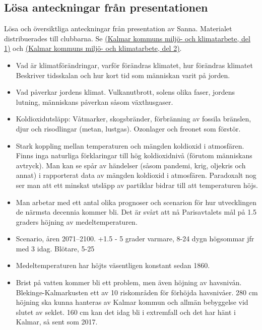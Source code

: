 \documentclass[12pt,a4paper]{article}
\begin{document}
\subsection{Lösa anteckningar från presentationen}
Lösa och översiktliga anteckningar från presentation av Sanna.
Materialet distribuerades till clubbarna.
Se \href{https://drive.google.com/file/d/1YFRy9aKXgjax-PG_uBX6mUw-uPgGtokU/view?usp=sharing}{(Kalmar kommuns miljö- och klimatarbete, del 1)} och \href{https://drive.google.com/file/d/1i5cKcDhBcyRaRvuqarhPM3Op02g_-FOt/view?usp=sharing}{(Kalmar kommuns miljö- och klimatarbete, del 2)}.

\begin{itemize}
  \item Vad är klimatförändringar, varför förändras klimatet, hur förändras klimatet
    Beskriver tidsskalan och hur kort tid som människan varit på jorden.
  \item Vad påverkar jordens klimat. Vulkanutbrott, solens olika faser, jordens lutning, människans påverkan såsom växthusgaser.
  \item Koldioxidutsläpp:
    Våtmarker, skogsbränder, förbränning av fossila bränslen, djur och risodlingar (metan, lustgas).
    Ozonlager och freonet som förstör.
  \item Stark koppling mellan temperaturen och mängden koldioxid i atmosfären.
Finns inga naturliga förklaringar till hög koldioxidnivå (förutom människans avtryck).
Man kan se spår av händelser (såsom pandemi, krig, oljekris och annat) i rapporterat data av mängden koldioxid i atmosfären.
Paradoxalt nog ser man att ett minskat utsläpp av partiklar bidrar till att temperaturen höjs.

\item Man arbetar med ett antal olika prognoser och scenarion för hur utvecklingen de närmsta decennia kommer bli. Det är svårt att nå Parisavtalets mål på 1.5 graders höjning av medeltemperaturen.

\item Scenario, åren 2071--2100. +1.5 - 5 grader varmare, 8-24 dygn högsommar jfr med 3 idag. Blötare, 5-25%

\item Medeltemperaturen har höjts väsentligen konstant sedan 1860.

\item Brist på vatten kommer bli ett problem, men även höjning av havsnivån.
Blekinge-Kalmarkusten ett av 10 riskområden för förhöjda havsnivåer.
280 cm höjning ska kunna hanteras av Kalmar kommun och allmän bebyggelse vid slutet av seklet.
160 cm kan det idag bli i extremfall och det har hänt i Kalmar, så sent som 2017.


\end{itemize}
\end{document}

